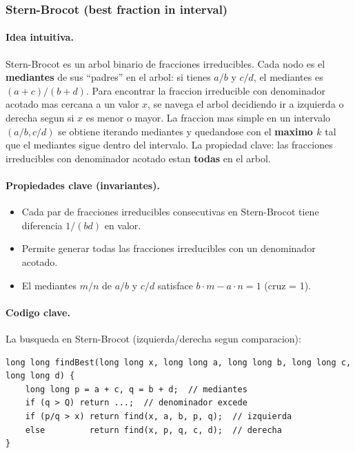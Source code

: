 ﻿\subsubsection{Stern-Brocot (best fraction in interval)}

\paragraph{Idea intuitiva.}
Stern-Brocot es un arbol binario de fracciones irreducibles. Cada nodo es el \textbf{mediantes} de sus ``padres'' en el arbol: si tienes $a/b$ y $c/d$, el mediantes es $(a+c)/(b+d)$. Para encontrar la fraccion irreducible con denominador acotado mas cercana a un valor $x$, se navega el arbol decidiendo ir a izquierda o derecha segun si $x$ es menor o mayor. La fraccion mas simple en un intervalo $(a/b, c/d)$ se obtiene iterando mediantes y quedandose con el \textbf{maximo $k$} tal que el mediantes sigue dentro del intervalo. La propiedad clave: las fracciones irreducibles con denominador acotado estan \textbf{todas} en el arbol.

\paragraph{Propiedades clave (invariantes).}
\begin{itemize}\setlength\itemsep{0pt}
	\item Cada par de fracciones irreducibles consecutivas en Stern-Brocot tiene diferencia $1/(bd)$ en valor.
	\item Permite generar todas las fracciones irreducibles con un denominador acotado.
	\item El mediantes $m/n$ de $a/b$ y $c/d$ satisface $b \cdot m - a \cdot n = 1$ (cruz = 1).
\end{itemize}

\paragraph{Codigo clave.}
La busqueda en Stern-Brocot (izquierda/derecha segun comparacion):
\begin{verbatim}
long long findBest(long long x, long long a, long long b, long long c, long long d) {
    long long p = a + c, q = b + d;  // mediantes
    if (q > Q) return ...;  // denominador excede
    if (p/q > x) return find(x, a, b, p, q);  // izquierda
    else         return find(x, p, q, c, d);  // derecha
}
\end{verbatim}

